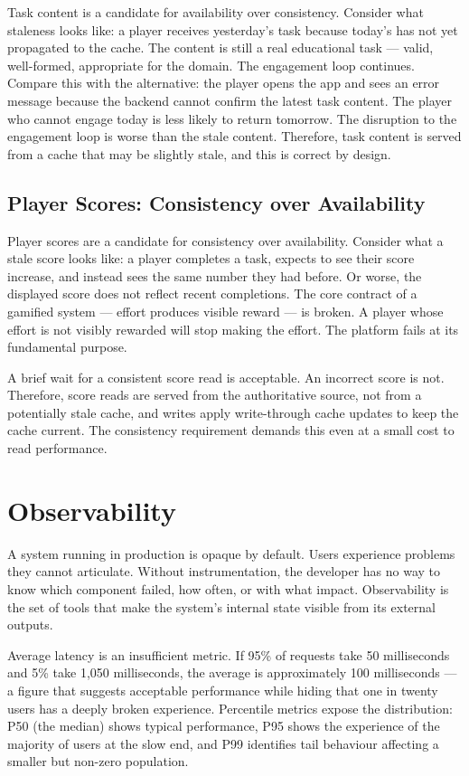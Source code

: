 Task content is a candidate for availability over consistency. Consider what staleness looks like: a player receives yesterday's task because today's has not yet propagated to the cache. The content is still a real educational task --- valid, well-formed, appropriate for the domain. The engagement loop continues. Compare this with the alternative: the player opens the app and sees an error message because the backend cannot confirm the latest task content. The player who cannot engage today is less likely to return tomorrow. The disruption to the engagement loop is worse than the stale content. Therefore, task content is served from a cache that may be slightly stale, and this is correct by design.

\subsection{Player Scores: Consistency over Availability}

Player scores are a candidate for consistency over availability. Consider what a stale score looks like: a player completes a task, expects to see their score increase, and instead sees the same number they had before. Or worse, the displayed score does not reflect recent completions. The core contract of a gamified system --- effort produces visible reward --- is broken. A player whose effort is not visibly rewarded will stop making the effort. The platform fails at its fundamental purpose.

A brief wait for a consistent score read is acceptable. An incorrect score is not. Therefore, score reads are served from the authoritative source, not from a potentially stale cache, and writes apply write-through cache updates to keep the cache current. The consistency requirement demands this even at a small cost to read performance.

\section{Observability}

A system running in production is opaque by default. Users experience problems they cannot articulate. Without instrumentation, the developer has no way to know which component failed, how often, or with what impact. Observability is the set of tools that make the system's internal state visible from its external outputs.

Average latency is an insufficient metric. If 95\% of requests take 50 milliseconds and 5\% take 1,050 milliseconds, the average is approximately 100 milliseconds --- a figure that suggests acceptable performance while hiding that one in twenty users has a deeply broken experience. Percentile metrics expose the distribution: P50 (the median) shows typical performance, P95 shows the experience of the majority of users at the slow end, and P99 identifies tail behaviour affecting a smaller but non-zero population.

